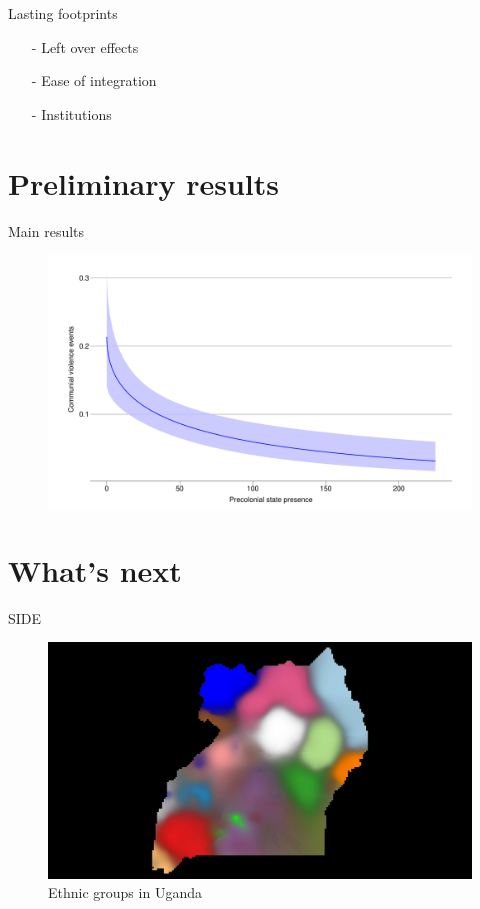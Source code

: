 \documentclass{beamer}
\begin{document}
\begin{frame}{Lasting footprints}

\begin{itemize}
	\item[-] Left over effects \pause
	\item[-] Ease of integration \pause
	\item[-] Institutions
\end{itemize}	

\end{frame}

\section{Preliminary results}

\begin{frame}{Main results}

	\begin{figure}[htpb]
		\centering
		\includegraphics[width=0.8\linewidth]{../R/Output/CommunalViolenceMargins.pdf}
		\label{Margins}
	\end{figure}

\end{frame}

\section{What's next}

\begin{frame}{SIDE}

\begin{figure}[htpb]
	\centering
	\includegraphics[width=0.8\linewidth]{img/UGA illustration1.pdf}
	\caption{Ethnic groups in Uganda}%
	\label{SIDE1}
\end{figure}	

\end{frame}
\end{document}
